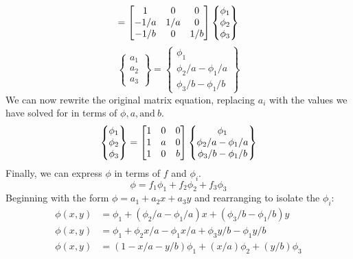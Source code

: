 \documentclass[12pt,letterpaper]{article}
\begin{document}
\begin{enumerate}[label=(\alph*)]
\begin{enumerate}[label=\arabic*.]
\begin{equation*}
				= \mqty[1 & 0 & 0 \\ -1/a & 1/a & 0 \\ -1/b & 0 & 1/b] 
				\begin{Bmatrix}
					\phi_1 \\ \phi_2 \\ \phi_3
				\end{Bmatrix}
			\end{equation*}
			\begin{equation*}
				\begin{Bmatrix}
					a_1 \\ a_2 \\ a_3
				\end{Bmatrix}
				= 
				\begin{Bmatrix}
					\phi_1 \\ \phi_2/a - \phi_1/a \\ \phi_3/b - \phi_1/b
				\end{Bmatrix}
			\end{equation*}
			We can now rewrite the original matrix equation, replacing $a_i$ with the values we have solved for in terms of $\phi, a, \textrm{and} \ b$.
			\begin{equation*}
				\begin{Bmatrix}
					\phi_1 \\ \phi_2 \\ \phi_3
				\end{Bmatrix}
				= \mqty[1 & 0 & 0 \\ 1 & a & 0 \\ 1 & 0 & b]
				\begin{Bmatrix}
					\phi_1 \\ \phi_2/a - \phi_1/a \\ \phi_3/b - \phi_1/b
				\end{Bmatrix}
			\end{equation*}
			Finally, we can express $\phi$ in terms of $f$ and $\phi_i$.
			\begin{equation*}
				\phi = f_1\phi_1 + f_2\phi_2 + f_3\phi_3
			\end{equation*}			
			Beginning with the form $\phi = a_1 + a_2x + a_3y$ and rearranging to isolate the $\phi_i$:
			\begin{align*}
				\phi(x,y) &= \phi_1 + (\phi_2/a - \phi_1/a)x + ( \phi_3/b - \phi_1/b)y\\
				\phi(x,y) &= \phi_1 + \phi_2x/a - \phi_1x/a + \phi_3y/b - \phi_1y/b\\
				\phi(x,y) &=  (1 - x/a - y/b)\phi_1 + (x/a) \phi_2 + (y/b)\phi_3
			\end{align*}

\end{enumerate}
\end{enumerate}
\end{document}
